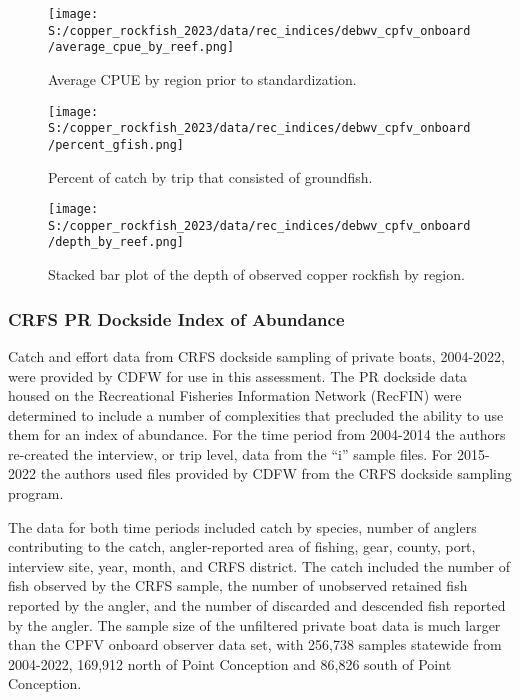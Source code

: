 \documentclass[11pt,
  english,
  letterpaper,
]{article}
\begin{document}
\newpage

\begin{figure}
\centering
\texttt{[image: S:/copper\_rockfish\_2023/data/rec\_indices/debwv\_cpfv\_onboard/average\_cpue\_by\_reef.png]}
\caption{Average CPUE by region prior to standardization.\label{fig:deb-regioncpue}}
\end{figure}

\newpage

\begin{figure}
\centering
\texttt{[image: S:/copper\_rockfish\_2023/data/rec\_indices/debwv\_cpfv\_onboard/percent\_gfish.png]}
\caption{Percent of catch by trip that consisted of groundfish.\label{fig:deb-percent-gfish}}
\end{figure}

\newpage

\begin{figure}
\centering
\texttt{[image: S:/copper\_rockfish\_2023/data/rec\_indices/debwv\_cpfv\_onboard/depth\_by\_reef.png]}
\caption{Stacked bar plot of the depth of observed copper rockfish by region.\label{fig:deb-depths}}
\end{figure}

\newpage

\hypertarget{crfs-pr-index}{%
\subsubsection{CRFS PR Dockside Index of Abundance}\label{crfs-pr-index}}

Catch and effort data from CRFS dockside sampling of private boats, 2004-2022, were provided by CDFW for use in this assessment. The PR dockside data housed on the Recreational Fisheries Information Network (RecFIN) were determined to include a number of complexities that precluded the ability to use them for an index of abundance. For the time period from 2004-2014 the authors re-created the interview, or trip level, data from the ``i'' sample files. For 2015-2022 the authors used files provided by CDFW from the CRFS dockside sampling program.

The data for both time periods included catch by species, number of anglers contributing to the catch, angler-reported area of fishing, gear, county, port, interview site, year, month, and CRFS district. The catch included the number of fish observed by the CRFS sample, the number of unobserved retained fish reported by the angler, and the number of discarded and descended fish reported by the angler. The sample size of the unfiltered private boat data is much larger than the CPFV onboard observer data set, with 256,738 samples statewide from 2004-2022, 169,912 north of Point Conception and 86,826 south of Point Conception.
\end{document}

